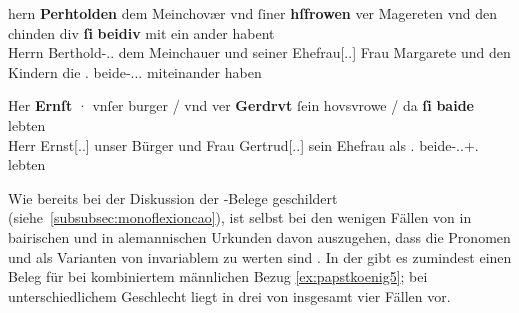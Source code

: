\begin{exe}
\ex \label{ex:m+f_si_beide_iu}
	\begin{xlist}
	\ex \label{ex:m+f_si_beidiu}
		\gll hern \textbf{Perhtolden} dem Meinchovær vnd ſiner \textbf{hſfrowen} ver
				Magereten vnd den chinden div \textbf{ſi} \textbf{beidiv} {mit
				ein ander} habent \\
			Herrn Berthold-\Dat.\Sg.\MascM{} dem Meinchauer und seiner
				Ehefrau[\Dat.\Sg.\FemF] Frau Margarete und den Kindern die
				\Tpl\subMF.\Nom{} beide-\Nom.\Pl.\NeutMF.\St{} miteinander
				haben \\
		\begin{taggedline}{\parencites(Regensburg, 1287)[\pno~937, 292.40--41]{cao2}}
		\trans {}
		\end{taggedline}

	\ex \label{ex:m+f_si_beide}
		\gll Her \textbf{Ernſt} · vnſer burger / vnd ver \textbf{Gerdrvt} ſein
				hovsvrowe / da \textbf{ſi} \textbf{baide} lebten \\
			Herr Ernst[\Nom.\Sg.\MascM] {} unser Bürger {} und Frau
				Gertrud[\Nom.\Sg.\FemF] sein Ehefrau {} als \Tpl\subMF.\Nom{}
				beide-\Nom.\Pl.\M+\F\subMF.\St{} lebten \\
		\begin{taggedline}{\parencites(Wien, 1289)[\pno~1073, 374.40--41]{cao2}}
		\trans {}
		\end{taggedline}
	\end{xlist}
\end{exe}

Wie bereits bei der Diskussion der -Belege geschildert
(siehe~\cref{subsubsec:monoflexioncao}), ist selbst bei den wenigen Fällen von
 in bairischen und  in alemannischen Urkunden
davon auszugehen, dass die Pronomen  und  als Varianten von
invariablem  zu werten sind \autocite[vgl.][394--396]{ksw2}. In der
\citet{kc} gibt es zumindest einen Beleg für  bei kombiniertem
männlichen Bezug \cref{ex:papstkoenig5}; bei unterschiedlichem Geschlecht liegt
 in drei von insgesamt vier Fällen vor.

